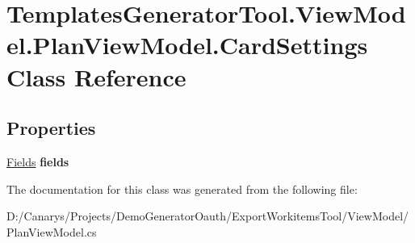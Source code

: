 \hypertarget{class_templates_generator_tool_1_1_view_model_1_1_plan_view_model_1_1_card_settings}{}\section{Templates\+Generator\+Tool.\+View\+Model.\+Plan\+View\+Model.\+Card\+Settings Class Reference}
\label{class_templates_generator_tool_1_1_view_model_1_1_plan_view_model_1_1_card_settings}
\subsection*{Properties}
\begin{DoxyCompactItemize}
\item 
\mbox{\label{class_templates_generator_tool_1_1_view_model_1_1_plan_view_model_1_1_card_settings_acb756df4f2f866fd5ce9d6c0c18de698}} 
\mbox{\hyperlink{class_templates_generator_tool_1_1_view_model_1_1_plan_view_model_1_1_fields}{Fields}} {\bfseries fields}
\end{DoxyCompactItemize}


The documentation for this class was generated from the following file\+:\begin{DoxyCompactItemize}
\item 
D\+:/\+Canarys/\+Projects/\+Demo\+Generator\+Oauth/\+Export\+Workitems\+Tool/\+View\+Model/Plan\+View\+Model.\+cs\end{DoxyCompactItemize}
